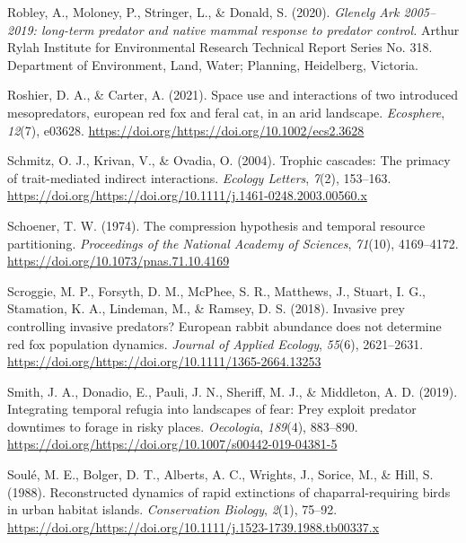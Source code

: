 \documentclass[]{elsarticle} %
\begin{document}
\leavevmode\hypertarget{ref-robley2020glenelg}{}%
Robley, A., Moloney, P., Stringer, L., \& Donald, S. (2020). \emph{Glenelg Ark 2005--2019: long-term predator and native mammal response to predator control.} Arthur Rylah Institute for Environmental Research Technical Report Series No. 318. Department of Environment, Land, Water; Planning, Heidelberg, Victoria.

\leavevmode\hypertarget{ref-roshier2021space}{}%
Roshier, D. A., \& Carter, A. (2021). Space use and interactions of two introduced mesopredators, european red fox and feral cat, in an arid landscape. \emph{Ecosphere}, \emph{12}(7), e03628. \url{https://doi.org/https://doi.org/10.1002/ecs2.3628}

\leavevmode\hypertarget{ref-schmitz2004trophic}{}%
Schmitz, O. J., Krivan, V., \& Ovadia, O. (2004). Trophic cascades: The primacy of trait-mediated indirect interactions. \emph{Ecology Letters}, \emph{7}(2), 153--163. \url{https://doi.org/https://doi.org/10.1111/j.1461-0248.2003.00560.x}

\leavevmode\hypertarget{ref-schoener1974compression}{}%
Schoener, T. W. (1974). The compression hypothesis and temporal resource partitioning. \emph{Proceedings of the National Academy of Sciences}, \emph{71}(10), 4169--4172. \url{https://doi.org/10.1073/pnas.71.10.4169}

\leavevmode\hypertarget{ref-scroggie2018invasive}{}%
Scroggie, M. P., Forsyth, D. M., McPhee, S. R., Matthews, J., Stuart, I. G., Stamation, K. A., Lindeman, M., \& Ramsey, D. S. (2018). Invasive prey controlling invasive predators? European rabbit abundance does not determine red fox population dynamics. \emph{Journal of Applied Ecology}, \emph{55}(6), 2621--2631. \url{https://doi.org/https://doi.org/10.1111/1365-2664.13253}

\leavevmode\hypertarget{ref-smith2019integrating}{}%
Smith, J. A., Donadio, E., Pauli, J. N., Sheriff, M. J., \& Middleton, A. D. (2019). Integrating temporal refugia into landscapes of fear: Prey exploit predator downtimes to forage in risky places. \emph{Oecologia}, \emph{189}(4), 883--890. \url{https://doi.org/https://doi.org/10.1007/s00442-019-04381-5}

\leavevmode\hypertarget{ref-soule1988reconstructed}{}%
Soulé, M. E., Bolger, D. T., Alberts, A. C., Wrights, J., Sorice, M., \& Hill, S. (1988). Reconstructed dynamics of rapid extinctions of chaparral-requiring birds in urban habitat islands. \emph{Conservation Biology}, \emph{2}(1), 75--92. \url{https://doi.org/https://doi.org/10.1111/j.1523-1739.1988.tb00337.x}
\end{document}
